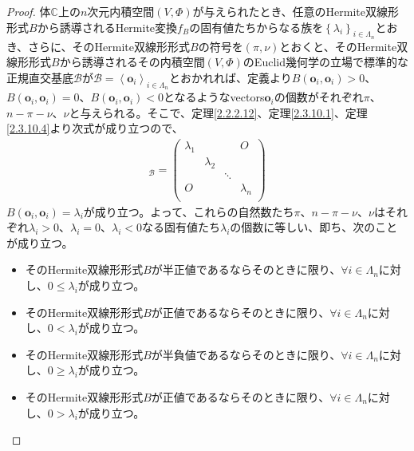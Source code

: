 \documentclass[dvipdfmx]{jsarticle}
\begin{document}
\begin{proof}
体$\mathbb{C}$上の$n$次元内積空間$(V,\varPhi)$が与えられたとき、任意のHermite双線形形式$B$から誘導されるHermite変換$f_{B}$の固有値たちからなる族を$\left\{ \lambda_{i} \right\}_{i \in \varLambda_{n}}$とおき、さらに、そのHermite双線形形式$B$の符号を$(\pi,\nu)$とおくと、そのHermite双線形形式$B$から誘導されるその内積空間$(V,\varPhi)$のEuclid幾何学の立場で標準的な正規直交基底$\mathcal{B}$が$\mathcal{B} =\left\langle \mathbf{o}_{i} \right\rangle_{i \in \varLambda_{n}}$とおかれれば、定義より$B\left( \mathbf{o}_{i},\mathbf{o}_{i} \right) > 0$、$B\left( \mathbf{o}_{i},\mathbf{o}_{i} \right) = 0$、$B\left( \mathbf{o}_{i},\mathbf{o}_{i} \right) < 0$となるようなvectors$\mathbf{o}_{i}$の個数がそれぞれ$\pi$、$n - \pi - \nu$、$\nu$と与えられる。そこで、定理\ref{2.2.2.12}、定理\ref{2.3.10.1}、定理\ref{2.3.10.4}より次式が成り立つので、
\begin{align*}
[ B]_{\mathcal{B}} = \begin{pmatrix}
\lambda_{1} & \  & \  & O \\
\  & \lambda_{2} & \  & \  \\
\  & \  & \ddots & \  \\
O & \  & \  & \lambda_{n} \\
\end{pmatrix}
\end{align*}
$B\left( \mathbf{o}_{i},\mathbf{o}_{i} \right) = \lambda_{i}$が成り立つ。よって、これらの自然数たち$\pi$、$n - \pi - \nu$、$\nu$はそれぞれ$\lambda_{i} > 0$、$\lambda_{i} = 0$、$\lambda_{i} < 0$なる固有値たち$\lambda_{i}$の個数に等しい、即ち、次のことが成り立つ。
\begin{itemize}
\item
  そのHermite双線形形式$B$が半正値であるならそのときに限り、$\forall i \in \varLambda_{n}$に対し、$0 \leq \lambda_{i}$が成り立つ。
\item
  そのHermite双線形形式$B$が正値であるならそのときに限り、$\forall i \in \varLambda_{n}$に対し、$0 < \lambda_{i}$が成り立つ。
\item
  そのHermite双線形形式$B$が半負値であるならそのときに限り、$\forall i \in \varLambda_{n}$に対し、$0 \geq \lambda_{i}$が成り立つ。
\item
  そのHermite双線形形式$B$が正値であるならそのときに限り、$\forall i \in \varLambda_{n}$に対し、$0 > \lambda_{i}$が成り立つ。
\end{itemize}
\end{proof}
\end{document}
